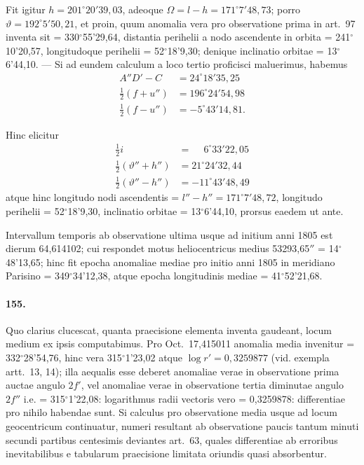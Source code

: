 \documentclass[12pt,a4paper]{article}
\begin{document}
Fit igitur $h = 201^\circ20'39,03$, adeoque $\Omega = l - h = 171^\circ7'48,73$; porro $\vartheta = 192^\circ5'50,21$, et proin, quum anomalia vera pro observatione prima in art.~97 inventa sit = 330$^\circ$55'29,64, distantia perihelii a nodo ascendente in orbita = 241$^\circ$10'20,57, longitudoque perihelii = 52$^\circ$18'9,30; denique inclinatio orbitae = 13$^\circ$6'44,10. --- Si ad eundem calculum a loco tertio proficisci maluerimus, habemus
\begin{align*}
A''D' - C &= 24^\circ18'35,25\\
\tfrac{1}{2}(f + u'') &= 196^\circ24'54,98\\
\tfrac{1}{2}(f - u'') &= -5^\circ43'14,81.
\end{align*}

Hinc elicitur
\begin{align*}
\tfrac{1}{2}i &= \phantom{-}6^\circ33'22,05\\
\tfrac{1}{2}(\vartheta'' + h'') &= 21^\circ24'32,44\\
\tfrac{1}{2}(\vartheta'' - h'') &= -11^\circ43'48,49
\end{align*}
atque hinc longitudo nodi ascendentis = $l'' - h'' = 171^\circ7'48,72$, longitudo perihelii = 52$^\circ$18'9,30, inclinatio orbitae = 13$^\circ$6'44,10, prorsus eaedem ut ante.

Intervallum temporis ab observatione ultima usque ad initium anni 1805 est dierum 64,614102; cui respondet motus heliocentricus medius 53293,65$''$ = 14$^\circ$48'13,65; hinc fit epocha anomaliae mediae pro initio anni 1805 in meridiano Parisino = 349$^\circ$34'12,38, atque epocha longitudinis mediae = 41$^\circ$52'21,68.

\paragraph{155.}
Quo clarius clucescat, quanta praecisione elementa inventa gaudeant, locum medium ex ipsis computabimus. Pro Oct.~17,415011 anomalia media invenitur = 332$^\circ$28'54,76, hinc vera 315$^\circ$1'23,02 atque $\log r' = 0,3259877$ (vid. exempla artt.~13, 14); illa aequalis esse deberet anomaliae verae in observatione prima auctae angulo $2f'$, vel anomaliae verae in observatione tertia diminutae angulo $2f''$ i.e. = 315$^\circ$1'22,08: logarithmus radii vectoris vero = 0,3259878: differentiae pro nihilo habendae sunt. Si calculus pro observatione media usque ad locum geocentricum continuatur, numeri resultant ab observatione paucis tantum minuti secundi partibus centesimis deviantes art.~63, quales differentiae ab erroribus inevitabilibus e tabularum praecisione limitata oriundis quasi absorbentur.
\end{document}
